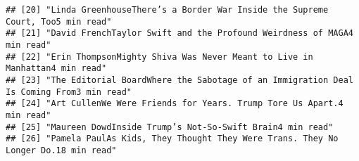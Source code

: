 \documentclass[
]{article}
\begin{document}
\begin{verbatim}
## [20] "Linda GreenhouseThere’s a Border War Inside the Supreme Court, Too5 min read"                                                                                                                                                                                                                                                                                                                                         
## [21] "David FrenchTaylor Swift and the Profound Weirdness of MAGA4 min read"                                                                                                                                                                                                                                                                                                                                                
## [22] "Erin ThompsonMighty Shiva Was Never Meant to Live in Manhattan4 min read"                                                                                                                                                                                                                                                                                                                                             
## [23] "The Editorial BoardWhere the Sabotage of an Immigration Deal Is Coming From3 min read"                                                                                                                                                                                                                                                                                                                                
## [24] "Art CullenWe Were Friends for Years. Trump Tore Us Apart.4 min read"                                                                                                                                                                                                                                                                                                                                                  
## [25] "Maureen DowdInside Trump’s Not-So-Swift Brain4 min read"                                                                                                                                                                                                                                                                                                                                                              
## [26] "Pamela PaulAs Kids, They Thought They Were Trans. They No Longer Do.18 min read"                                                                                                                                                                                                                                                                                                                                      

\end{verbatim}
\end{document}

